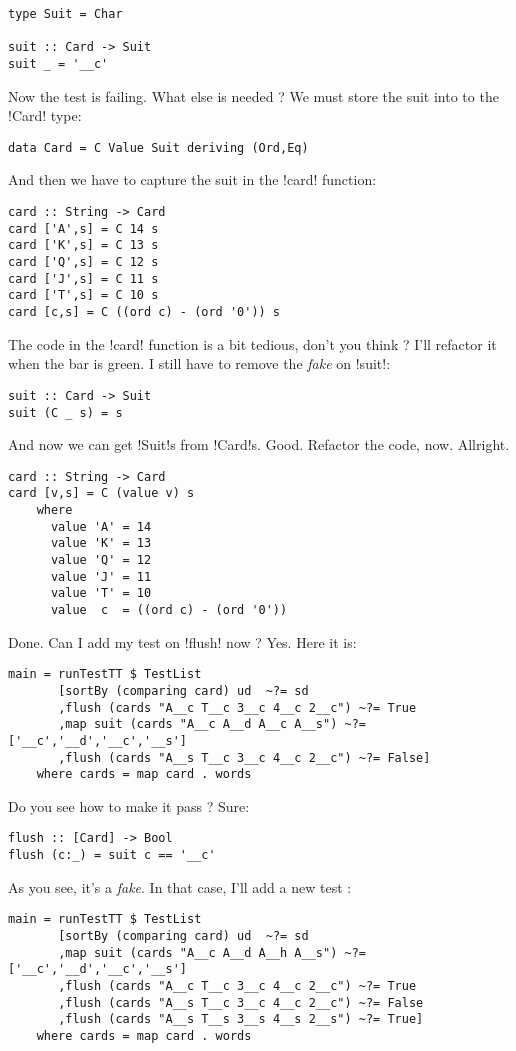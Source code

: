 \begin{lstlisting}[frame=single]
type Suit = Char

suit :: Card -> Suit
suit _ = '__c'
\end{lstlisting}
\failure Now the test is failing.
\lhN What else is needed ?
\lhA \failure We must store the suit into to the \il!Card! type:
\begin{lstlisting}[frame=single]
data Card = C Value Suit deriving (Ord,Eq)
\end{lstlisting}
And then we have to capture the suit in the \il!card! function:
\begin{lstlisting}[frame=single]
card :: String -> Card
card ['A',s] = C 14 s
card ['K',s] = C 13 s
card ['Q',s] = C 12 s
card ['J',s] = C 11 s
card ['T',s] = C 10 s
card [c,s] = C ((ord c) - (ord '0')) s
\end{lstlisting}
\lhN \failure The code in the \il!card! function is a bit tedious, don't you think ?
\lhA \failure I'll refactor it when the bar is green. I still have to remove the \emph{fake} on \il!suit!:
\begin{lstlisting}[frame=single]
suit :: Card -> Suit
suit (C _ s) = s
\end{lstlisting}
\success And now we can get \il!Suit!s from \il!Card!s.
\lhN Good. Refactor the code, now.
\lhA \success Allright.
\begin{lstlisting}[frame=single]
card :: String -> Card
card [v,s] = C (value v) s
    where 
      value 'A' = 14
      value 'K' = 13
      value 'Q' = 12
      value 'J' = 11
      value 'T' = 10
      value  c  = ((ord c) - (ord '0'))
\end{lstlisting}
\success Done.
\lhN Can I add my test on \il!flush! now ?
\lhA Yes.
\lhN Here it is:
\begin{lstlisting}[frame=single]
main = runTestTT $ TestList 
       [sortBy (comparing card) ud  ~?= sd
       ,flush (cards "A__c T__c 3__c 4__c 2__c") ~?= True
       ,map suit (cards "A__c A__d A__c A__s") ~?= ['__c','__d','__c','__s']
       ,flush (cards "A__s T__c 3__c 4__c 2__c") ~?= False]
    where cards = map card . words
\end{lstlisting} %
Do you see how to make it pass ?
\lhA \failure Sure: 
\begin{lstlisting}[frame=single]
flush :: [Card] -> Bool
flush (c:_) = suit c == '__c'
\end{lstlisting}
\success As you see, it's a \emph{fake}.
\lhN In that case, I'll add a new test :
\begin{lstlisting}[frame=single]
main = runTestTT $ TestList 
       [sortBy (comparing card) ud  ~?= sd
       ,map suit (cards "A__c A__d A__h A__s") ~?= ['__c','__d','__c','__s']
       ,flush (cards "A__c T__c 3__c 4__c 2__c") ~?= True
       ,flush (cards "A__s T__c 3__c 4__c 2__c") ~?= False
       ,flush (cards "A__s T__s 3__s 4__s 2__s") ~?= True]
    where cards = map card . words
\end{lstlisting} %
